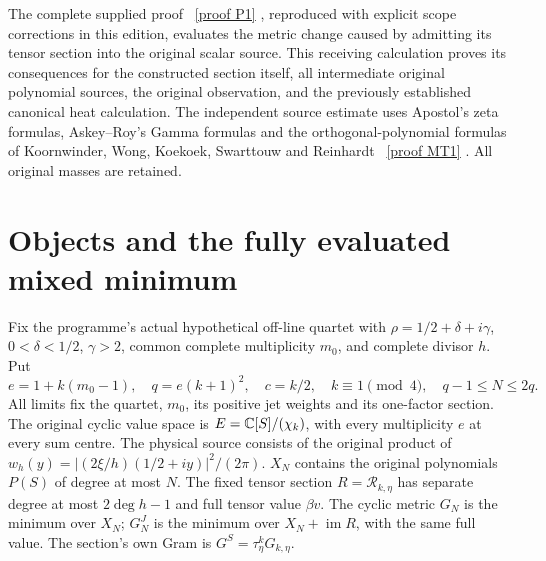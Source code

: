 \documentclass[11pt]{article}
\begin{document}
The complete supplied proof \cite{mrjm:Input}%
~\href{https://github.com/KokunoYumeto/zeta-function-research-reader/blob/main/workbenches/splitzero-tandem/continuations/20260921-kernel-degree-steps/providers/SUPPLIED_PROOF_INTEGRATED.tex\#L49}{[proof P1]}%
{}, reproduced with explicit
scope corrections in this edition, evaluates the metric change caused by
admitting its tensor section into the original scalar source.
This receiving calculation proves its consequences for the constructed
section itself, all intermediate original polynomial sources, the original
observation, and the previously established canonical heat calculation.
The independent source estimate uses Apostol's zeta formulas,
Askey--Roy's Gamma formulas and the orthogonal-polynomial formulas of
Koornwinder, Wong, Koekoek, Swarttouw and Reinhardt
\cite{mrjm:Apostol,mrjm:Gamma,mrjm:MP}%
~\href{https://github.com/KokunoYumeto/zeta-function-research-reader/blob/main/workbenches/splitzero-tandem/continuations/20260921-kernel-degree-steps/providers/OBSERVATION_COMPLETE_PROOFS.tex\#L1629}{[proof MT1]}%
{}. All original masses are retained.

\section{Objects and the fully evaluated mixed minimum}
Fix the programme's actual hypothetical off-line quartet with
$\rho=1/2+\delta+i\gamma$, $0<\delta<1/2$, $\gamma>2$, common complete
multiplicity $m_0$, and complete divisor $h$. Put
\[
 e=1+k(m_0-1),\quad q=e(k+1)^2,\quad c=k/2,\quad
 k\equiv1\pmod4,\quad q-1\le N\le2q.
 \tag{JM1}
\]
All limits fix the quartet, $m_0$, its positive jet weights and its
one-factor section. The original cyclic value space is
$E=\mathbb C[S]/(\chi_k)$, with every multiplicity $e$ at every sum centre.
The physical source consists of the original product of
$w_h(y)=|(2\xi/h)(1/2+iy)|^2/(2\pi)$.
$X_N$ contains the original polynomials $P(S)$ of degree at most $N$.
The fixed tensor section $R=\mathcal R_{k,\eta}$ has separate degree
at most $2\deg h-1$ and full tensor value $\beta v$.
The cyclic metric $G_N$ is the minimum over $X_N$; $G_N^J$ is the
minimum over $X_N+\operatorname{im}R$, with the same full value.
The section's own Gram is $G^S=\tau_\eta^kG_{k,\eta}$.
\end{document}
